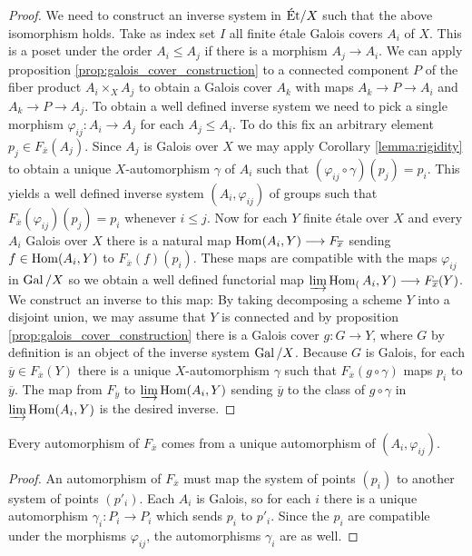 \begin{proof}
	We need to construct an inverse system in $\text{\'Et}/X$ such that the above isomorphism holds. Take as index set $I$ all finite \'etale Galois covers $A_i$ of $X$. This is a poset under the order $A_i \le A_j$ if there is a morphism $A_j \to A_i$. We can apply proposition \ref{prop:galois_cover_construction} to a connected component $P$ of the fiber product $A_i \times_X A_j$ to obtain a Galois cover $A_k$ with maps $A_k \to P \to A_i$ and $A_k \to P \to A_j$. To obtain a well defined inverse system we need to pick a single morphism $\varphi_{ij} \colon A_i \to A_j$ for each $A_j \le A_i$. To do this fix an arbitrary element $p_j \in F_{\overline{x}}(A_j)$. Since $A_j$ is Galois over $X$ we may apply Corollary \ref{lemma:rigidity} to obtain a unique $X$-automorphism $\gamma$ of $A_i$ such that $(\varphi_{ij} \circ \gamma) (p_j) = p_i$. This yields a well defined inverse system $(A_i, \varphi_{ij})$ of groups such that $F_{\overline{x}}(\varphi_{ij})(p_j) = p_i$ whenever $i \le j$. Now for each $Y$ finite \'etale over $X$ and every $A_i$ Galois over $X$ there is a natural map $\operatorname{Hom}(A_i, Y) \longrightarrow F_{\overline{x}}$ sending $f \in \operatorname{Hom}(A_i,Y)$ to $F_{\overline{x}}(f)(p_i)$. These maps are compatible with the maps $\varphi_{ij}$ in $\operatorname{Gal}/X$ so we obtain a well defined functorial map $\varinjlim \operatorname{Hom}_(A_i, Y) \longrightarrow F_{\overline{x}}(Y)$. We construct an inverse to this map: By taking decomposing a scheme $Y$ into a disjoint union, we may assume that $Y$ is connected and by proposition \ref{prop:galois_cover_construction} there is a Galois cover $g: G \to Y$, where $G$ by definition is an object of the inverse system $\operatorname{Gal}/X$. Because $G$ is Galois, for each $\overline{y} \in F_{\overline{x}}(Y)$ there is a unique $X$-automorphism $\gamma$ such that $F_{\overline{x}}(g \circ \gamma)$ maps $p_i$ to $\overline{y}$. The map from $F_{\overline{y}}$ to $\varinjlim \operatorname{Hom}(A_i, Y)$ sending $\overline{y}$ to the class of $g \circ \gamma$ in $\varinjlim\operatorname{Hom}(A_i,Y)$ is the desired inverse.
\end{proof}

\begin{corollary}
	Every automorphism of $F_{\overline{x}}$ comes from a unique automorphism of $(A_i, \varphi_{ij})$.
\end{corollary}

\begin{proof}
	An automorphism of $F_{\overline{x}}$ must map the system of points $(p_i)$ to another system of points $(p'_i)$. Each $A_i$ is Galois, so for each $i$ there is a unique automorphism $\gamma_i \colon P_i \to P_i$ which sends $p_i$ to $p'_i$. Since the $p_i$ are compatible under the morphisms $\varphi_{ij}$, the automorphisms $\gamma_i$ are as well.
\end{proof}

